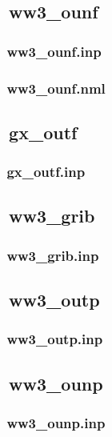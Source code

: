 \vssub
\subsection{~ww3\_ounf}
\vsssub
\subsubsection{~ww3\_ounf.inp} \label{sec:config131}
\vsssub
\vsssub
\subsubsection{~ww3\_ounf.nml} \label{sec:config132}
\vsssub
\vssub

\vssub
\subsection{~gx\_outf}
\vsssub
\subsubsection{~gx\_outf.inp} \label{sec:config141}
\vsssub
\vssub

\vssub
\subsection{~ww3\_grib}
\vsssub
\subsubsection{~ww3\_grib.inp} \label{sec:config151}
\vsssub
\vssub

\vssub
\subsection{~ww3\_outp}
\vsssub
\subsubsection{~ww3\_outp.inp} \label{sec:config161}
\vsssub
\vssub

\vssub
\subsection{~ww3\_ounp}
\vsssub
\subsubsection{~ww3\_ounp.inp} \label{sec:config171}
\vsssub
\vsssub
